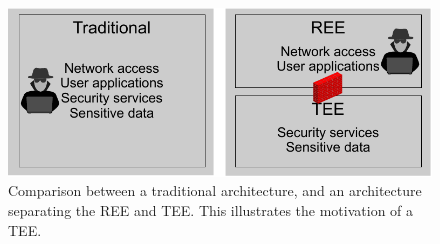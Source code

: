 \begin{figure}[htpb]
  \centering
  \includegraphics[width=0.8\linewidth]{figures/TEE-motivation.pdf}
  \caption{Comparison between a traditional architecture, and an architecture separating the REE and TEE. This illustrates the motivation of a TEE.} \label{fig:tee_motivation}
\end{figure}
